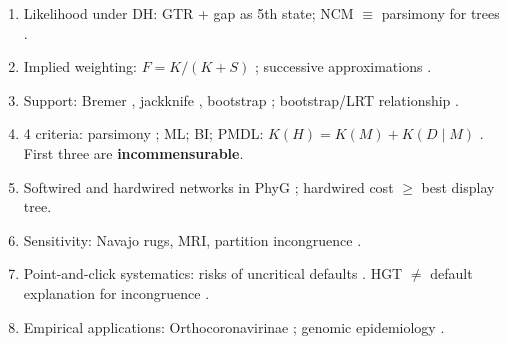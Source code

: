 \begin{revise}
\begin{enumerate}[itemsep=0pt, topsep=0pt, parsep=0pt]
    \item Likelihood under DH: GTR + gap as 5th state; NCM $\equiv$ parsimony for trees \parencite{tuffleysteel1997}.
    \item Implied weighting: $F = K/(K+S)$ \parencite{goloboff1993b,goloboff2013}; successive approximations \parencite{farris1969}.
    \item Support: Bremer \parencite{bremer1988}, jackknife \parencite{farrisetal1996}, bootstrap \parencite{felsenstein1985}; bootstrap/LRT relationship \parencite{jacobmachado2021d}.
    \item 4 criteria: parsimony \parencite{farris1983}; ML; BI; PMDL: $K(H) = K(M) + K(D\mid M)$ \parencite{wheelervaron2025}. First three are \textbf{incommensurable}.
    \item Softwired and hardwired networks in PhyG \parencite{wheeleretal2024}; hardwired cost $\geq$ best display tree.
    \item Sensitivity: Navajo rugs, MRI, partition incongruence \parencite{wheeleretal2006,wheeler1995,morrisonellis1997}.
    \item Point-and-click systematics: risks of uncritical defaults \parencite{grant2003}. HGT $\neq$ default explanation for incongruence \parencite{wheeler2012}.
    \item Empirical applications: Orthocoronavirinae \parencite{jacobmachado2021a}; genomic epidemiology \parencite{jacobmachado2021b}.
\end{enumerate}
\end{revise}

\clearpage

\printbibliography[heading=subbibliography,title={References}]
